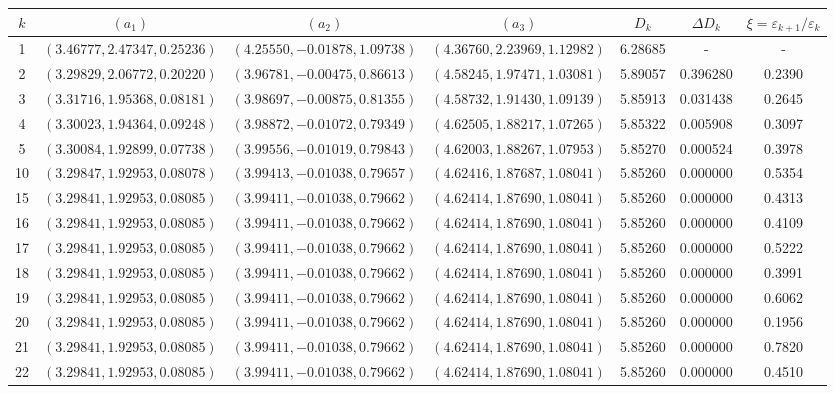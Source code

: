 \documentclass[12pt]{article}
\renewcommand{\arraystretch}{1.2} %
\theoremstyle{plain}
\theoremstyle{definition}
\begin{document}
\begin{table}[H]
	\centering
	\small 
	\begin{sideways}
		\renewcommand{\arraystretch}{1.5} %
		\begin{tabular}{|c|c|c|c|c|c|c|}
			\hline
			$k$ & $(a_1)$ & $(a_2)$ & $(a_3)$ & $D_k$ & $\Delta D_k$ & $\xi=\varepsilon_{k+1}/\varepsilon_{k}$ \\ 
			\hline
			1  & $(3.46777, 2.47347, 0.25236)$ & $(4.25550, -0.01878, 1.09738)$ & $(4.36760, 2.23969, 1.12982)$ & 6.28685 & - & - \\ \hline
			
			2  & $(3.29829, 2.06772, 0.20220)$ & $(3.96781, -0.00475, 0.86613)$ & $(4.58245, 1.97471, 1.03081)$ & 5.89057 & 0.396280 & 0.2390 \\ \hline
			3  & $(3.31716, 1.95368, 0.08181)$ & $(3.98697, -0.00875, 0.81355)$ & $(4.58732, 1.91430, 1.09139)$ & 5.85913 & 0.031438 & 0.2645 \\ \hline
			4  & $(3.30023, 1.94364, 0.09248)$ & $(3.98872, -0.01072, 0.79349)$ & $(4.62505, 1.88217, 1.07265)$ & 5.85322 & 0.005908 & 0.3097 \\ \hline
			5  & $(3.30084, 1.92899, 0.07738)$ & $(3.99556, -0.01019, 0.79843)$ & $(4.62003, 1.88267, 1.07953)$ & 5.85270 & 0.000524 & 0.3978 \\ \hline
			
			10 & $(3.29847, 1.92953, 0.08078)$ & $(3.99413, -0.01038, 0.79657)$ & $(4.62416, 1.87687, 1.08041)$ & 5.85260 & 0.000000 & 0.5354 \\ \hline
			
			15 & $(3.29841, 1.92953, 0.08085)$ & $(3.99411, -0.01038, 0.79662)$ & $(4.62414, 1.87690, 1.08041)$ & 5.85260 & 0.000000 & 0.4313 \\ \hline
			16 & $(3.29841, 1.92953, 0.08085)$ & $(3.99411, -0.01038, 0.79662)$ & $(4.62414, 1.87690, 1.08041)$ & 5.85260 & 0.000000 & 0.4109 \\ \hline
			17 & $(3.29841, 1.92953, 0.08085)$ & $(3.99411, -0.01038, 0.79662)$ & $(4.62414, 1.87690, 1.08041)$ & 5.85260 & 0.000000 & 0.5222 \\ \hline
			18 & $(3.29841, 1.92953, 0.08085)$ & $(3.99411, -0.01038, 0.79662)$ & $(4.62414, 1.87690, 1.08041)$ & 5.85260 & 0.000000 & 0.3991 \\ \hline
			19 & $(3.29841, 1.92953, 0.08085)$ & $(3.99411, -0.01038, 0.79662)$ & $(4.62414, 1.87690, 1.08041)$ & 5.85260 & 0.000000 & 0.6062 \\ \hline
			20 & $(3.29841, 1.92953, 0.08085)$ & $(3.99411, -0.01038, 0.79662)$ & $(4.62414, 1.87690, 1.08041)$ & 5.85260 & 0.000000 & 0.1956 \\ \hline
			21 & $(3.29841, 1.92953, 0.08085)$ & $(3.99411, -0.01038, 0.79662)$ & $(4.62414, 1.87690, 1.08041)$ & 5.85260 & 0.000000 & 0.7820 \\ \hline
			22 & $(3.29841, 1.92953, 0.08085)$ & $(3.99411, -0.01038, 0.79662)$ & $(4.62414, 1.87690, 1.08041)$ & 5.85260 & 0.000000 & 0.4510 \\ \hline
		\end{tabular}
		

\end{sideways}
\end{table}
\end{document}
